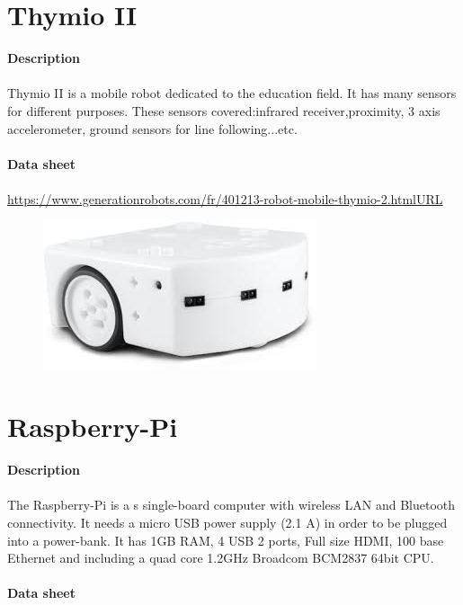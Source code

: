 \documentclass[12pt]{report}
\begin{document}
\section{Thymio II}
\textbf{Description} 
\paragraph{}
Thymio II is a mobile robot dedicated to the education field. It has many sensors for different purposes. These sensors covered:infrared receiver,proximity, 3 axis accelerometer, ground sensors for line following...etc.
\\ \\
\textbf{Data sheet} 
\paragraph{}
\url{https://www.generationrobots.com/fr/401213-robot-mobile-thymio-2.htmlURL}
\begin{figure}[H]
	\begin{center}
		\includegraphics[scale=0.6]{res/thymio.jpg}
	\end{center}
\end{figure}
\section{Raspberry-Pi}
\textbf{Description}
\paragraph{}
The Raspberry-Pi is a s single-board computer with wireless LAN and Bluetooth connectivity. It needs a micro USB power supply (2.1 A) in order to be plugged into a power-bank. It has 1GB RAM, 4 USB 2 ports, Full size HDMI, 100 base Ethernet and including a quad core 1.2GHz Broadcom BCM2837 64bit CPU.\\ \\
\textbf{Data sheet} 
\end{document}
